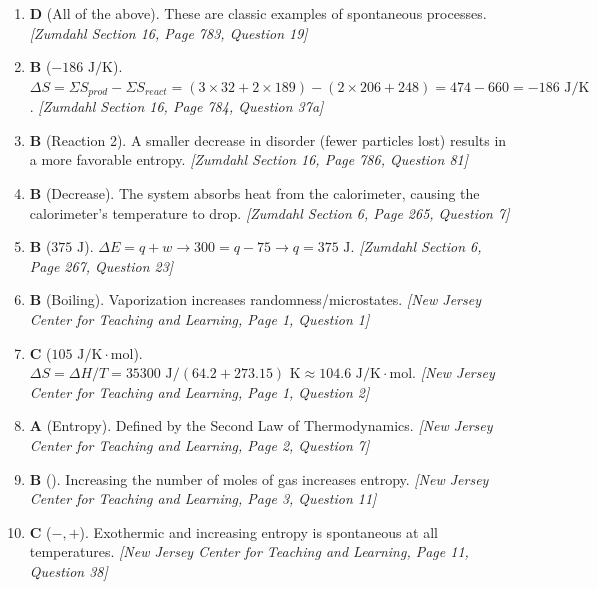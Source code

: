 \documentclass[12pt,letterpaper]{article}
\begin{document}
\begin{enumerate}
    \item \textbf{D} (All of the above). These are classic examples of spontaneous processes. \textit{[Zumdahl Section 16, Page 783, Question 19]}
    
    \item \textbf{B} ($-186\text{ J/K}$). $\Delta S = \Sigma S_{prod} - \Sigma S_{react} = (3 \times 32 + 2 \times 189) - (2 \times 206 + 248) = 474 - 660 = -186\text{ J/K}$. \textit{[Zumdahl Section 16, Page 784, Question 37a]}
    
    \item \textbf{B} (Reaction 2). A smaller decrease in disorder (fewer particles lost) results in a more favorable entropy. \textit{[Zumdahl Section 16, Page 786, Question 81]}
    
    \item \textbf{B} (Decrease). The system absorbs heat from the calorimeter, causing the calorimeter's temperature to drop. \textit{[Zumdahl Section 6, Page 265, Question 7]}
    
    \item \textbf{B} ($375\text{ J}$). $\Delta E = q + w \rightarrow 300 = q - 75 \rightarrow q = 375\text{ J}$. \textit{[Zumdahl Section 6, Page 267, Question 23]}
    
    \item \textbf{B} (Boiling). Vaporization increases randomness/microstates. \textit{[New Jersey Center for Teaching and Learning, Page 1, Question 1]}
    
    \item \textbf{C} ($105\text{ J/K}\cdot\text{mol}$). $\Delta S = \Delta H / T = 35300\text{ J} / (64.2 + 273.15)\text{ K} \approx 104.6\text{ J/K}\cdot\text{mol}$. \textit{[New Jersey Center for Teaching and Learning, Page 1, Question 2]}
    
    \item \textbf{A} (Entropy). Defined by the Second Law of Thermodynamics. \textit{[New Jersey Center for Teaching and Learning, Page 2, Question 7]}
    
    \item \textbf{B} (). Increasing the number of moles of gas increases entropy. \textit{[New Jersey Center for Teaching and Learning, Page 3, Question 11]}
    
    \item \textbf{C} ($-, +$). Exothermic and increasing entropy is spontaneous at all temperatures. \textit{[New Jersey Center for Teaching and Learning, Page 11, Question 38]}
    

\end{enumerate}
\end{document}
